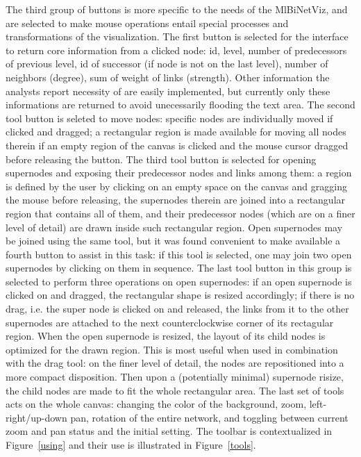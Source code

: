 \documentclass[runningheads]{llncs}
\begin{document}
The third group of buttons is more specific to the needs of the MlBiNetViz, and
are selected to make mouse operations entail special processes and transformations of the visualization.
The first button is selected for the interface to return core information from a clicked node:
id, level, number of predecessors of previous level, id of successor (if node is not on the last level),
number of neighbors (degree), sum of weight of links (strength).
Other information the analysts report necessity of are easily implemented, but currently only these informations
are returned to avoid unecessarily flooding the text area.
The second tool button is seleted to move nodes: specific nodes are individually moved if clicked and dragged;
a rectangular region is made available for moving all nodes therein if an empty region of the canvas
is clicked and the mouse cursor dragged before releasing the button.
The third tool button is selected for opening supernodes and exposing their predecessor nodes and links among them:
a region is defined by the user by clicking on an empty space on the canvas and gragging the mouse before releasing,
the supernodes therein are joined into a rectangular region that contains all of them,
and their predecessor nodes (which are on a finer level of detail) are drawn inside such rectangular region.
Open supernodes may be joined using the same tool, but it was found convenient to make available a
fourth button to assist in this task: if this tool is selected, one may join two open supernodes by
clicking on them in sequence.
The last tool button in this group is selected to perform three operations on open supernodes:
if an open supernode is clicked on and dragged, the rectangular shape is resized accordingly;
if there is no drag, i.e. the super node is clicked on and released, the links from it to the other
supernodes are attached to the next counterclockwise corner of its rectagular region.
When the open supernode is resized, the layout of its child nodes is optimized for the drawn region.
This is most useful when used in combination with the drag tool:
on the finer level of detail, the nodes are repositioned into a more compact disposition.
Then upon a (potentially minimal) supernode
risize, the child nodes are made to fit the whole rectangular area.
The last set of tools acts on the whole canvas:
changing the color of the background, zoom, left-right/up-down pan,
rotation of the entire network,
and toggling between current zoom and pan status and the initial setting.
The toolbar is contextualized in Figure~\ref{using} and their use is illustrated in Figure~\ref{tools}.
\end{document}
